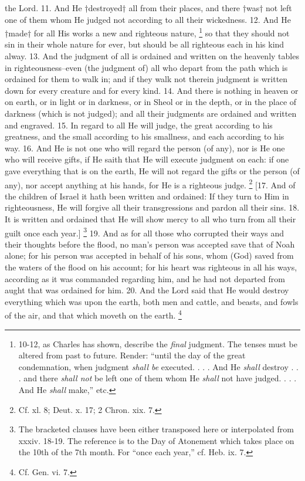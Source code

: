 the Lord. 11. And He †destroyed† all from their places, and there †was† not left one of them whom He judged not according to all their wickedness. 12. And He †made† for all His works a new and righteous nature, \footnote{10-12, as Charles has shown, describe the \emph{final} judgment. The tenses must be altered from past to future. Render: ``until the day of the great condemnation, when judgment \emph{shall be} executed. . . . And He \emph{shall} destroy . . . and there \emph{shall not} be left one of them whom He \emph{shall} not have judged. . . . And He \emph{shall} make,'' etc.} so that they should not sin in their whole nature for ever, but should be all righteous each in his kind alway. 13. And the judgment of all is ordained and written on the heavenly tables in righteousness--even (the judgment of) all who depart from the path which is ordained for them to walk in; and if they walk not therein judgment is written down for every creature and for every kind. 14. And there is nothing in heaven or on earth, or in light or in darkness, or in Sheol or in the depth, or in the place of darkness (which is not judged); and all their judgments are ordained and written and engraved. 15. In regard to all He will judge, the great according to his greatness, and the small according to his smallness, and each according to his way. 16. And He is not one who will regard the person (of any), nor is He one who will receive gifts, if He saith that He will execute judgment on each: if one gave everything that is on the earth, He will not regard the gifts or the person (of any), nor accept anything at his hands, for He is a righteous judge. \footnote{Cf. xl. 8; Deut. x. 17; 2 Chron. xix. 7.} [17. And of the children of Israel it hath been written and ordained: If they turn to Him in righteousness, He will forgive all their transgressions and pardon all their sins. 18. It is written and ordained that He will show mercy to all who turn from all their guilt once each year.] \footnote{The bracketed clauses have been either transposed here or interpolated from xxxiv. 18-19. The reference is to the Day of Atonement which takes place on the 10th of the 7th month. For ``once each year,'' cf. Heb. ix. 7.} 19. And as for all those who corrupted their ways and their thoughts before the flood, no man's person was accepted save that of Noah alone; for his person was accepted in behalf of his sons, whom (God) saved from the waters of the flood on his account; for his heart was righteous in all his ways, according as it was commanded regarding him, and he had not departed from aught that was ordained for him. 20. And the Lord said that He would destroy everything which was upon the earth, both men and cattle, and beasts, and fowls of the air, and that which moveth on the earth. \footnote{Cf. Gen. vi. 7.}

